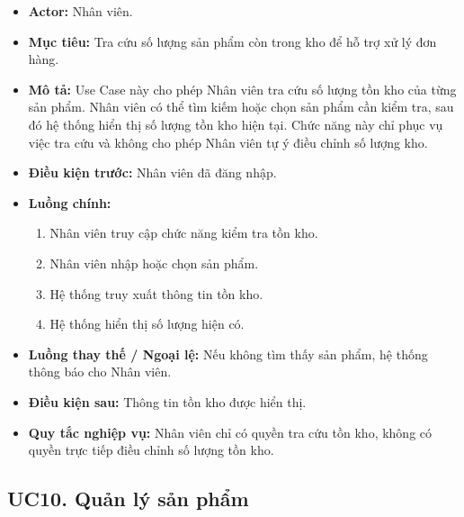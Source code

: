 \documentclass[12pt,a4paper]{article}
\begin{document}
\begin{itemize}

    \item \textbf{Actor:} Nhân viên.

    \item \textbf{Mục tiêu:} Tra cứu số lượng sản phẩm còn trong kho để hỗ trợ xử lý đơn hàng.

    \item \textbf{Mô tả:} Use Case này cho phép Nhân viên tra cứu số lượng tồn kho của từng sản phẩm. Nhân viên có thể tìm kiếm hoặc chọn sản phẩm cần kiểm tra, sau đó hệ thống hiển thị số lượng tồn kho hiện tại. Chức năng này chỉ phục vụ việc tra cứu và không cho phép Nhân viên tự ý điều chỉnh số lượng kho.

    \item \textbf{Điều kiện trước:} Nhân viên đã đăng nhập.

    \item \textbf{Luồng chính:}
    \begin{enumerate}
        \item Nhân viên truy cập chức năng kiểm tra tồn kho.
        \item Nhân viên nhập hoặc chọn sản phẩm.
        \item Hệ thống truy xuất thông tin tồn kho.
        \item Hệ thống hiển thị số lượng hiện có.
    \end{enumerate}

    \item \textbf{Luồng thay thế / Ngoại lệ:} Nếu không tìm thấy sản phẩm, hệ thống thông báo cho Nhân viên.

    \item \textbf{Điều kiện sau:} Thông tin tồn kho được hiển thị.

    \item \textbf{Quy tắc nghiệp vụ:} Nhân viên chỉ có quyền tra cứu tồn kho, không có quyền trực tiếp điều chỉnh số lượng tồn kho.

\end{itemize}

\subsection*{UC10. Quản lý sản phẩm}
\end{document}
